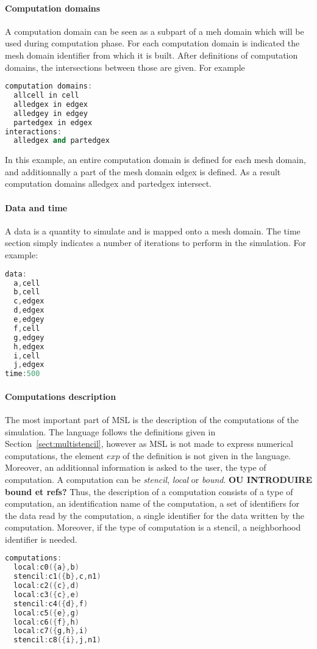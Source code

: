 \paragraph{Computation domains} A computation domain can be seen as a subpart of a meh domain which will be used during computation phase. For each computation domain is indicated the mesh domain identifier from which it is built. After definitions of computation domains, the intersections between those are given. For example
\begin{lstlisting}[basicstyle=\small,mathescape,frame=single,language=C++]
computation domains:
  allcell in cell
  alledgex in edgex
  alledgey in edgey
  partedgex in edgex
interactions:
  alledgex and partedgex
\end{lstlisting}
In this example, an entire computation domain is defined for each mesh domain, and additionnally a part of the mesh domain edgex is defined. As a result computation domains alledgex and partedgex intersect.

\paragraph{Data and time} A data is a quantity to simulate and is mapped onto a mesh domain. The time section simply indicates a number of iterations to perform in the simulation. For example:
\begin{lstlisting}[basicstyle=\small,mathescape,frame=single,language=C++]
data:
  a,cell
  b,cell
  c,edgex
  d,edgex
  e,edgey
  f,cell
  g,edgey
  h,edgex
  i,cell
  j,edgex
time:500
\end{lstlisting}

\paragraph{Computations description} The most important part of MSL is the description of the computations of the simulation. The language follows the definitions given in Section~\ref{sect:multistencil}, however as MSL is not made to express numerical computations, the element $exp$ of the definition is not given in the language. Moreover, an additionnal information is asked to the user, the type of computation. A computation can be \emph{stencil}, \emph{local} or \emph{bound}. \textbf{OU INTRODUIRE bound et refs?}
Thus, the description of a computation consists of a type of computation, an identification name of the computation, a set of identifiers for the data read by the computation, a single identifier for the data written by the computation. Moreover, if the type of computation is a stencil, a neighborhood identifier is needed.
\begin{lstlisting}[basicstyle=\small,mathescape,frame=single,language=C++]
computations:
  local:c0({a},b)
  stencil:c1({b},c,n1)
  local:c2({c},d)
  local:c3({c},e)
  stencil:c4({d},f)
  local:c5({e},g)
  local:c6({f},h)
  local:c7({g,h},i)
  stencil:c8({i},j,n1)
\end{lstlisting}

